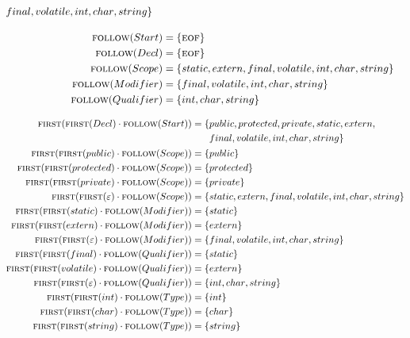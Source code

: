 \documentclass{report}
\newcommand{\Null}{\varepsilon}
\newcommand{\Seq}{\cdot}
\newcommand{\FIRST}{\textsc{first}}
\newcommand{\FOLLOW}{\textsc{follow}}
\newcommand{\EOF}{\textsc{eof}}
\newcommand{\NT}[1]{{#1}}
\newcommand{\T}[1]{{#1}}
\begin{document}
\begin{equation*}
\begin{aligned}
\begin{aligned}[t]
        &\T{final}, \T{volatile}, \T{int}, \T{char}, \T{string}\}\end{aligned}\\[1em]
        \FOLLOW(\NT{Start}) &= \{\EOF\}\\
        \FOLLOW(\NT{Decl}) &= \{\EOF\}\\
        \FOLLOW(\NT{Scope}) &= \{\T{static}, \T{extern}, \T{final}, \T{volatile}, \T{int}, \T{char}, \T{string}\}\\
        \FOLLOW(\NT{Modifier}) &= \{\T{final}, \T{volatile}, \T{int}, \T{char}, \T{string}\}\\
        \FOLLOW(\NT{Qualifier}) &= \{\T{int}, \T{char}, \T{string}\}\\
      \end{aligned}
    \end{equation*}

    \begin{equation*}
      \begin{aligned}
        \FIRST(\FIRST(\NT{Decl}) \Seq \FOLLOW(\NT{Start})) &= \begin{aligned}[t]\{&\T{public}, \T{protected}, \T{private}, \T{static}, \T{extern},\\
        &\T{final}, \T{volatile}, \T{int}, \T{char}, \T{string}\}\end{aligned}\\
        \FIRST(\FIRST(\T{public}) \Seq \FOLLOW(\NT{Scope})) &= \{\T{public}\}\\
        \FIRST(\FIRST(\T{protected}) \Seq \FOLLOW(\NT{Scope})) &= \{\T{protected}\}\\
        \FIRST(\FIRST(\T{private}) \Seq \FOLLOW(\NT{Scope})) &= \{\T{private}\}\\
        \FIRST(\FIRST(\Null) \Seq \FOLLOW(\NT{Scope})) &= \{\T{static}, \T{extern}, \T{final}, \T{volatile}, \T{int}, \T{char}, \T{string}\}\\
        \FIRST(\FIRST(\T{static}) \Seq \FOLLOW(\NT{Modifier})) &= \{\T{static}\}\\
        \FIRST(\FIRST(\T{extern}) \Seq \FOLLOW(\NT{Modifier})) &= \{\T{extern}\}\\
        \FIRST(\FIRST(\Null) \Seq \FOLLOW(\NT{Modifier})) &= \{\T{final}, \T{volatile}, \T{int}, \T{char}, \T{string}\}\\
        \FIRST(\FIRST(\T{final}) \Seq \FOLLOW(\NT{Qualifier})) &= \{\T{static}\}\\
        \FIRST(\FIRST(\T{volatile}) \Seq \FOLLOW(\NT{Qualifier})) &= \{\T{extern}\}\\
        \FIRST(\FIRST(\Null) \Seq \FOLLOW(\NT{Qualifier})) &= \{\T{int}, \T{char}, \T{string}\}\\
        \FIRST(\FIRST(\T{int}) \Seq \FOLLOW(\NT{Type})) &= \{\T{int}\}\\
        \FIRST(\FIRST(\T{char}) \Seq \FOLLOW(\NT{Type})) &= \{\T{char}\}\\
        \FIRST(\FIRST(\T{string}) \Seq \FOLLOW(\NT{Type})) &= \{\T{string}\}\\
      \end{aligned}
    \end{equation*}
\end{document}

